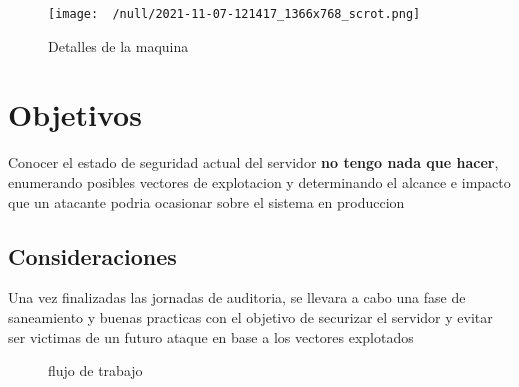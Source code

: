 \documentclass[a4paper]{article} %
\newcommand{\machineName}{no tengo nada que hacer}
\begin{document}
   \vspace{0.2cm}
   
    \begin{figure}[h]
    \centering
        \texttt{[image: ~/null/2021-11-07-121417\_1366x768\_scrot.png]}
        \caption{Detalles de la maquina}
    \end{figure}

    \begin{tcolorbox}[enhanced,attach boxed title to top center={yshift=-3mm,yshifttext=-1mm},
      colback=blue!5!white,colframe=blue!75!black,colbacktitle=greenPortada!80!black,
      title=Direccionamiento,fonttitle=\bfseries,
      boxed title style={size=small,colframe=red!50!black} ]

        \centering   
        \href{https://caasimilas.com}{\color{blue}{https://caasimilas.com}}
    \end{tcolorbox}

    \vspace{0.1cm}

   \clearpage

   \section{Objetivos}
    Conocer el estado de seguridad actual del servidor \textbf{\machineName}, enumerando posibles vectores de explotacion y determinando el alcance e impacto que un atacante podria ocasionar sobre el sistema en produccion
    \subsection{Consideraciones}
    Una vez finalizadas las jornadas de auditoria, se llevara a cabo una fase de saneamiento y buenas practicas con el objetivo de securizar el servidor y evitar ser victimas de un futuro ataque en base a los vectores explotados 

    \vspace{0.5cm}
    \begin{figure}[h]
       \begin{center}
       \end{center} 
    \caption{flujo de trabajo}
    \end{figure}
    \clearpage
\end{document}
